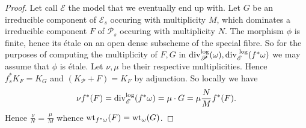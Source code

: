 \begin{proof}
	Let call $\mathscr E$ the model that we eventually end up with. 
	Let $G$ be an irreducible component of $\mathscr E_s $ occuring with multiplicity $M$, which dominates a irreducible component $F$ of $\mathscr P_s$ occuring with multiplicity $N$. 
	The morphism $\phi$ is finite, hence its étale on an open dense subscheme of the special fibre.
	So for the purposes of computing the multiplicity of $F, G$ in $\operatorname{div}_\mathscr P ^{\text{log}}(\omega), \operatorname{div} _{\mathscr E}^{\text{ log}}(f^*\omega)$ we may assume that $\phi$ is étale. Let $\nu, \mu$ be their respective multiplicities. 
	Hence $f^*_s K_F = K_G$ and $(K_{\mathscr P} + F) = K_F$ by adjunction.
	So locally we have \[
		\nu f^*(F) = \operatorname{div}_{\mathscr E} ^{\text{log}} (f^*\omega) = \mu\cdot G  = \mu \frac{N}{M} f^* (F)  
	.\]
	Hence $\frac{\nu}{ N} = \frac{\mu}{M}$ whence $\operatorname{wt}_{f^*\omega}(F) = \operatorname{wt}_\omega(G)$. 
\end{proof}

